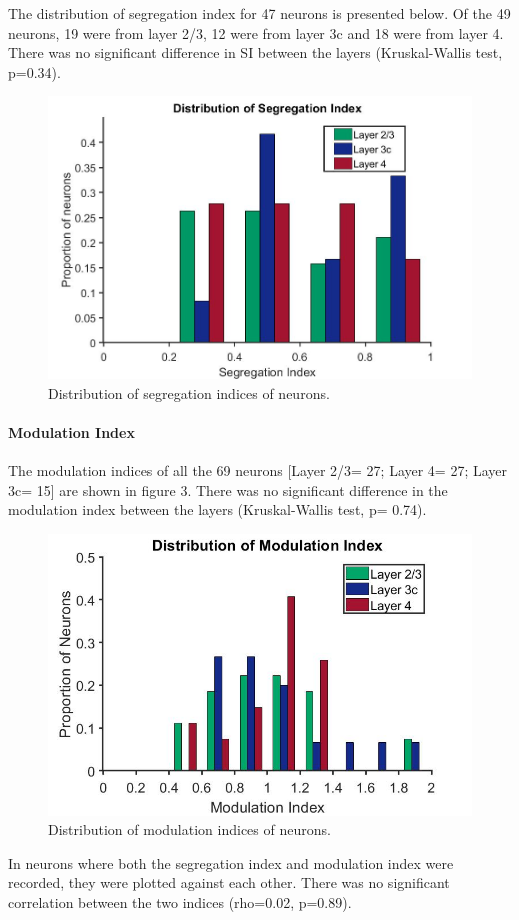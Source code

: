 	The distribution of segregation index for 47 neurons is presented below. Of the 49 neurons, 19 were from layer 2/3, 12 were from layer 3c and 18 were from layer 4. There was no significant difference in SI between the layers (Kruskal-Wallis test, p=0.34).
	\begin{figure}[H]
		
		\includegraphics[width=\linewidth]{LinearV1/segregationindex_colouradj.jpg}
		\caption{Distribution of segregation indices of neurons.}
		\label{fig:fig3}
	\end{figure}

	\paragraph{Modulation Index}
	The modulation indices of all the 69 neurons [Layer 2/3= 27; Layer 4= 27; Layer 3c= 15] are shown in figure 3. There was no significant difference in the modulation index between the layers (Kruskal-Wallis test, p= 0.74).
	
		\begin{figure}[H]
		
		\includegraphics[width=\linewidth]{LinearV1/modind_layer_colour.jpg}
		\caption{Distribution of modulation indices of neurons.}
		\label{fig:fig4}
	\end{figure}
	In neurons where both the segregation index and modulation index were recorded, they were plotted against each other. There was no significant correlation between the two indices (rho=0.02, p=0.89). 
	
